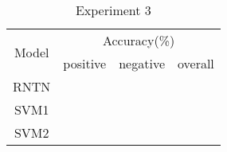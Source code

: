 \begin{itemize}
\begin{table}[H]
  \begin{center}
    \begin{tabular}{cccc}\hline
      \multirow{2}{*}{Model} 
      & \multicolumn{3}{c}{Accuracy(\%)} \\\cline{2-4}
    & positive & negative & overall \\ \hline
    RNTN  &          &     	   &      \\ 
    SVM1  & ~        &          &         \\ 
    SVM2  & ~        &          &         \\ \hline
    \end{tabular}
    \end{center}
    \caption{\label{exp5_3} Experiment 3}
\end{table}

\end{itemize}







